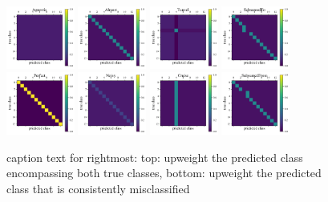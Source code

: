 \begin{figure}
	\begin{center}
		\includegraphics[width=0.2\textwidth]{./fig/Agnostic.png}
		\includegraphics[width=0.2\textwidth]{./fig/Almost.png}
		\includegraphics[width=0.2\textwidth]{./fig/Tunnel.png}
		\includegraphics[width=0.2\textwidth]{./fig/SubsumedTo.png}\\
		\includegraphics[width=0.2\textwidth]{./fig/Perfect.png}
		\includegraphics[width=0.2\textwidth]{./fig/Noisy.png}
		\includegraphics[width=0.2\textwidth]{./fig/Cruise.png}
		\includegraphics[width=0.2\textwidth]{./fig/SubsumedFrom.png}
		\caption{caption text for rightmost:
    top: upweight the predicted class encompassing both true classes, bottom: upweight the predicted class that is consistently misclassified}
		\label{fig:mock_cm}
	\end{center}
\end{figure}

